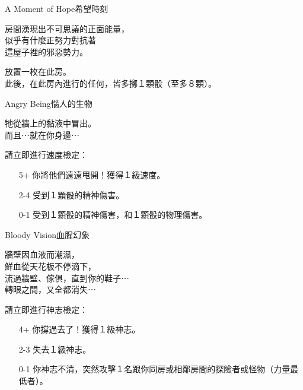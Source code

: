 
\begin{EventCard}{A Moment of Hope}{希望時刻}

  \begin{CardStory}
    房間湧現出不可思議的正面能量，\\
    似乎有什麼正努力對抗著\\
    這屋子裡的邪惡勢力。
  \end{CardStory}

  放置一枚在此房。\\[.5em]
  此後，在此房內進行的任何，皆多擲１顆骰（至多８顆）。\\[.5em]

\end{EventCard}%
%
\begin{EventCard}{Angry Being}{惱人的生物}

  \begin{CardStory}
    牠從牆上的黏液中冒出。\\
    而且⋯就在你身邊⋯
  \end{CardStory}

  請立即進行速度檢定：
  \begin{itemize}
    \item[5+] 你將他們遠遠甩開！獲得１級速度。
    \item[2-4] 受到１顆骰的精神傷害。
    \item[0-1] 受到１顆骰的精神傷害，和１顆骰的物理傷害。
  \end{itemize}

\end{EventCard}%
%
\begin{EventCard}{Bloody Vision}{血腥幻象}

  \begin{CardStory}
    牆壁因血液而潮濕，\\
    鮮血從天花板不停滴下，\\
    流過牆壁、傢俱，直到你的鞋子⋯\\
    轉眼之間，又全都消失⋯
  \end{CardStory}

  請立即進行神志檢定：
  \begin{itemize}
    \item[4+] 你撐過去了！獲得１級神志。
    \item[2-3] 失去１級神志。
    \item[0-1] 你神志不清，突然攻擊１名跟你同房或相鄰房間的探險者或怪物（力量最低者）。
  \end{itemize}

\end{EventCard}%
